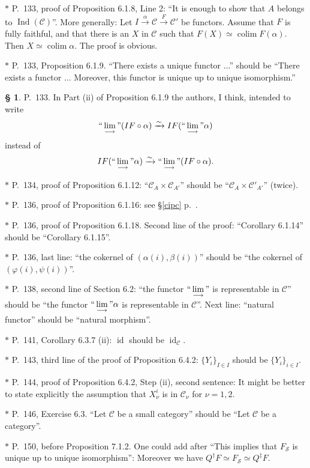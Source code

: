 \documentclass[12pt]{article}%
\theoremstyle{remark}
\theoremstyle{definition}
\newtheorem{s}[thm]{\S}%
\newcommand{\nn}{\noindent}
\newcommand{\C}{\mathcal C}
\newcommand{\SSS}{\mathcal S}
\newcommand{\pp}{\varphi}
\newcommand{\ilim}{\operatornamewithlimits{\underset{\longrightarrow}{lim}}}
\DeclareMathOperator*{\colim}{colim}%
\DeclareMathOperator{\id}{id}
\DeclareMathOperator{\Ind}{Ind}
\begin{document}
\nn$*$ P.~133, proof of Proposition 6.1.8, Line 2: ``It is enough to show that $A$ belongs to $\Ind(\C)$''. More generally: Let $I\xrightarrow{\alpha}\C\xrightarrow{F}\C'$ be functors. Assume that $F$ is fully faithful, and that there is an $X$ in $\C$ such that $F(X)\simeq\colim F(\alpha)$. Then $X\simeq\colim\alpha$. The proof is obvious.

\nn$*$ P.~133, Proposition 6.1.9. ``There exists a unique functor ...'' should be ``There exists a functor ... Moreover, this functor is unique up to unique isomorphism.''

\begin{s}\label{s133ii} 
P.~133. In Part (ii) of Proposition 6.1.9 the authors, I think, intended to write 
$$
``\ilim"(IF\circ\alpha)\xrightarrow\sim IF(``\ilim"\alpha)
$$
instead of 
$$
IF(``\ilim"\alpha)\xrightarrow\sim``\ilim"(IF\circ\alpha). 
$$ 
\end{s}

\nn$*$ P.~134, proof of Proposition 6.1.12: ``$\C_A\times\C_{A'}$'' should be ``$\C_A\times\C'_{A'}$'' (twice).

\nn$*$ P.~136, proof of Proposition 6.1.16: see \S\ref{cipc} p.~\pageref{cipc}.

\nn$*$ P.~136, proof of Proposition 6.1.18. Second line of the proof: ``Corollary 6.1.14'' should be ``Corollary 6.1.15''. 

\nn$*$ P.~136, last line: ``the cokernel of $(\alpha(i),\beta(i))$'' should be ``the cokernel of\linebreak $(\pp(i),\psi(i))$''. 

\nn$*$ P.~138, second line of Section 6.2: ``the functor $``\displaystyle\lim_{\longrightarrow}"$ is representable in $\C$'' should be ``the functor $``\displaystyle\lim_{\longrightarrow}"\alpha$ is representable in $\C$''. Next line: ``natural functor'' should be ``natural morphism''.

\nn$*$ P.~141, Corollary 6.3.7 (ii): $\id$ should be $\id_\C$.

\nn$*$ P.~143, third line of the proof of Proposition 6.4.2: $\{Y_i\}_{I\in I}$ should be $\{Y_i\}_{i\in I}$.

\nn$*$ P.~144, proof of Proposition 6.4.2, Step (ii), second sentence: It might be better to state explicitly the assumption that $X_\nu^i$ is in $\C_\nu$ for $\nu=1,2$. 

\nn$*$ P.~146, Exercise 6.3. ``Let $\C$ be a small category'' should be ``Let $\C$ be a category''.

\nn$*$ P.~150, before Proposition 7.1.2. One could add after ``This implies that $F_{\SSS}$ is unique up to unique isomorphism'': Moreover we have $Q^\dagger F\simeq F_{\SSS}\simeq Q^\ddagger F$.
\end{document}
